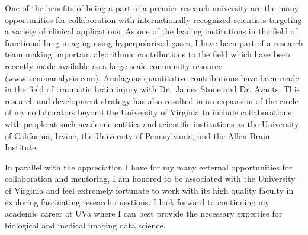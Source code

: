 \documentclass[
  11pt,
]{article}
\begin{document}
One of the benefits of being a part of a premier research university are
the many opportunities for collaboration with internationally recognized
scientists targeting a variety of clinical applications. As one of the
leading institutions in the field of functional lung imaging using
hyperpolarized gases, I have been part of a research team making
important algorithmic contributions to the field which have been
recently made available as a large-scale community resource
(www.xenonanalysis.com). Analagous quantitative contributions have been
made in the field of traumatic brain injury with Dr.~James Stone and Dr.
Avants. This research and development strategy has also resulted in an
expansion of the circle of my collaborators beyond the University of
Virginia to include collaborations with people at such academic entities
and scientific institutions as the University of California, Irvine, the
University of Pennsylvania, and the Allen Brain Institute.

In parallel with the appreciation I have for my many external
opportunities for collaboration and mentoring, I am honored to be
associated with the University of Virginia and feel extremely fortunate
to work with its high quality faculty in exploring fascinating research
questions. I look forward to continuing my academic career at UVa where
I can best provide the necessary expertise for biological and medical
imaging data science.
\end{document}
